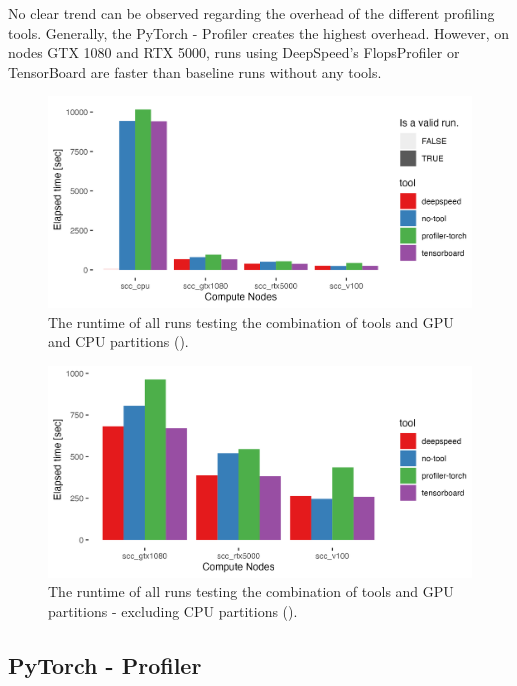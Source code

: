 \documentclass[12pt, a4paper, hidelinks]{article}
\begin{document}
No clear trend can be observed regarding the overhead of the different profiling tools. Generally, the PyTorch - Profiler creates the highest overhead. However, on nodes GTX 1080 and RTX 5000, runs using DeepSpeed's FlopsProfiler or TensorBoard are faster than baseline runs without any tools.

\begin{figure}[H]
\centering
\includegraphics[width=1\textwidth]{./assets/sacct_barplot_by_nodes_no-experiment}
\caption[Runtime of the experiments]{The runtime of all runs testing the combination of tools and \ac{GPU} and \ac{CPU} partitions (). }
\label{fig:sacct_barplot_by_nodes_no-experiment}
\end{figure}

\begin{figure}[H]
\centering
\includegraphics[width=1\textwidth]{./assets/sacct_barplot_by_nodes_no-experiment_gpu}
\caption[Runtime of the experiments (GPU-only)]{The runtime of all runs testing the combination of tools and \ac{GPU} partitions - excluding \ac{CPU} partitions ().}
\label{fig:sacct_barplot_by_nodes_no-experiment_gpu}
\end{figure}

\subsection{PyTorch - Profiler}
\label{sec:r-pytorch-profiler}
\end{document}
